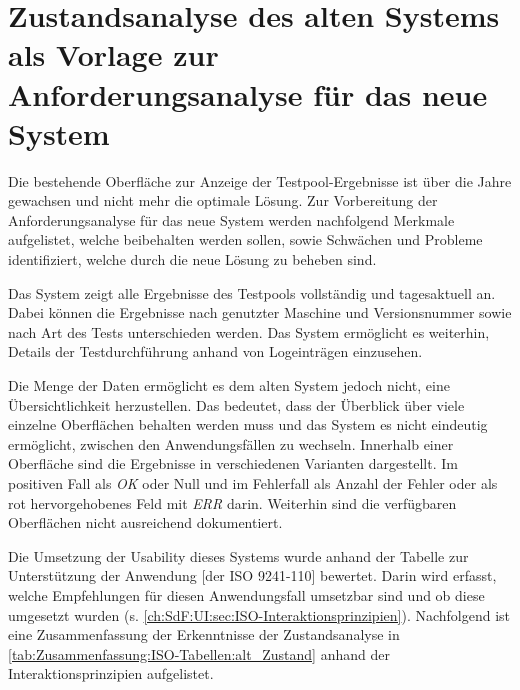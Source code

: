 \section{Zustandsanalyse des alten Systems als Vorlage zur Anforderungsanalyse für das neue System}
\label{ch:IST-Zustand:sec:Zustandsanalyse}

Die bestehende Oberfläche zur Anzeige der Testpool-Ergebnisse ist über die Jahre gewachsen und nicht mehr die optimale Lösung. Zur Vorbereitung der Anforderungsanalyse für das neue System werden nachfolgend Merkmale aufgelistet, welche beibehalten werden sollen, sowie Schwächen und Probleme identifiziert, welche durch die neue Lösung zu beheben sind.

Das System zeigt alle Ergebnisse des Testpools vollständig und tagesaktuell an. Dabei können die Ergebnisse nach genutzter Maschine und Versionsnummer sowie nach Art des Tests unterschieden werden. Das System ermöglicht es weiterhin, Details der Testdurchführung anhand von Logeinträgen einzusehen.

Die Menge der Daten ermöglicht es dem alten System jedoch nicht, eine Übersichtlichkeit herzustellen. Das bedeutet, dass der Überblick über viele einzelne Oberflächen behalten werden muss und das System es nicht eindeutig ermöglicht, zwischen den Anwendungsfällen zu wechseln.
Innerhalb einer Oberfläche sind die Ergebnisse in verschiedenen Varianten dargestellt. Im positiven Fall als \textit{OK} oder Null und im Fehlerfall als Anzahl der Fehler oder als rot hervorgehobenes Feld mit \textit{ERR} darin.
Weiterhin sind die verfügbaren Oberflächen nicht ausreichend dokumentiert.


Die Umsetzung der Usability dieses Systems wurde anhand der \glqq Tabelle zur Unterstützung der Anwendung [der ISO 9241-110]\grqq{} \cite{DIN_EN_ISO_9241-110} bewertet. %
Darin wird erfasst, welche Empfehlungen für diesen Anwendungsfall umsetzbar sind und ob diese umgesetzt wurden (s. \autoref{ch:SdF:UI:sec:ISO-Interaktionsprinzipien}). Nachfolgend ist eine Zusammenfassung der Erkenntnisse der Zustandsanalyse in \autoref{tab:Zusammenfassung:ISO-Tabellen:alt_Zustand} anhand der Interaktionsprinzipien aufgelistet.

